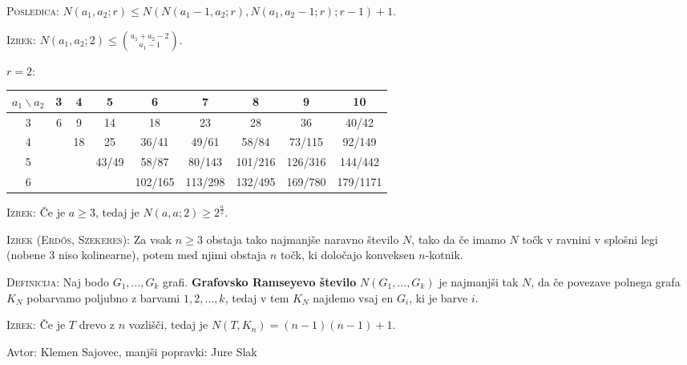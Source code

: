 \documentclass[8pt,a4paper]{amsart}
\theoremstyle{definition} %
\theoremstyle{plain} %
\begin{document}
\textsc{Posledica:} $N(a_1,a_2;r)\leq N(N(a_1-1,a_2;r),N(a_1,a_2-1;r);r-1)+1$.

\textsc{Izrek:} $N(a_1,a_2;2) \leq \binom{a_1+a_2-2}{a_1-1}$.

$r=2$:
\begin{tabular}{|c||c|c|c|c|c|c|c|c|} \hline
$a_1 \backslash a_2$ & 3 & 4 & 5 & 6 & 7 & 8 & 9 & 10 \\ \hline \hline
3 & 6 & 9 & 14 & 18 & 23 & 28 & 36 & 40/42 \\ \hline
4 &   & 18 & 25 & 36/41 & 49/61 & 58/84 & 73/115 & 92/149 \\ \hline
5 & & & 43/49 & 58/87 & 80/143 & 101/216 & 126/316 & 144/442 \\ \hline
6 & & & & 102/165 & 113/298 & 132/495 & 169/780 & 179/1171 \\ \hline

\end{tabular}

\textsc{Izrek:} Če je $a \geq 3$, tedaj je $N(a,a;2) \geq 2^{\frac{a}{2}}$.

\textsc{Izrek (Erdős, Szekeres):} Za vsak $n \geq 3$ obstaja tako najmanjše
naravno število $N$, tako da če imamo $N$ točk v ravnini v splošni legi (nobene
3 niso kolinearne), potem med njimi obstaja $n$ točk, ki določajo konveksen
$n$-kotnik.

\textsc{Definicija:} Naj bodo $G_1,\ldots ,G_k$ grafi. \textbf{Grafovsko
Ramseyevo število} $N(G_1,\ldots ,G_k)$ je najmanjši tak $N$, da če povezave
polnega grafa $K_N$ pobarvamo poljubno z barvami $1, 2, \ldots ,k$, tedaj v tem
$K_N$ najdemo vsaj en $G_i$, ki je barve $i$.

\textsc{Izrek:} Če je $T$ drevo z $n$ vozlišči, tedaj je $N(T,K_n) = (n-1)(n-1)+1$.


\hfill Avtor: Klemen Sajovec, manjši popravki: Jure Slak
\end{document}
